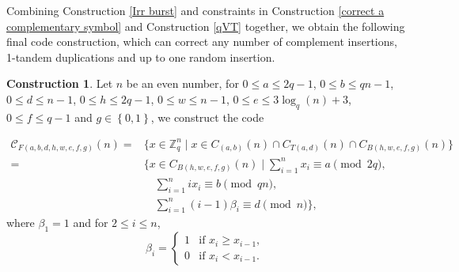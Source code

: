 \documentclass[pdflatex,sn-mathphys-num]{sn-jnl}
\theoremstyle{theorem}%
\theoremstyle{definition}
\theoremstyle{construction}
\newtheorem{construction}{Construction}
\newtheorem{open problem}{Open problem}
\begin{document}
Combining Construction \ref{Irr burst} and constraints in Construction \ref{correct a complementary symbol} and Construction \ref{qVT} together, we obtain the following final code construction, which can correct any number of complement insertions, 1-tandem duplications and up to one random insertion.
\begin{construction}\label{final construction}
Let $n$ be an even number, for $0\le a \le 2q-1$, $0\le b\le qn-1$, $0\le d \le n-1$, $0\le h \le 2q-1$, $0\le w \le n-1$, $0\le e\le 3\log_{q}(n)+3$, $0\le f\le q-1$ and $g\in \left\{0,1\right\}$, we construct the code

\begin{equation}
\begin{split}
	\mathcal{C}_{F(a,b,d,h,w,e,f,g)}(n) = & \bigg\{x\in \mathbb{Z}_{q}^{n} \mid x\in C_{(a,b)}(n) \cap C_{T(a,d)}(n) \cap C_{B(h,w,e,f,g)}(n)\bigg\} \\
	= & \bigg\{x\in C_{B(h,w,e,f,g)}(n) \mid \sum_{i=1}^{n}x_{i} \equiv a \pmod{2q}, \\
	& \quad \sum_{i=1}^{n}ix_{i} \equiv b \pmod{qn}, \\
	& \quad \sum_{i=1}^{n}(i-1)\beta_{i} \equiv d \pmod{n}\bigg\},
\end{split}
\end{equation}
where $\beta_{1}=1$ and for $2 \le i \le n$, \[
\beta_{i} = 
\begin{cases} 
	1 & \text{if } x_{i} \geq x_{i-1}, \\ 
	0 & \text{if } x_{i} < x_{i-1}. 
\end{cases}
\]
\end{construction}
\end{document}
